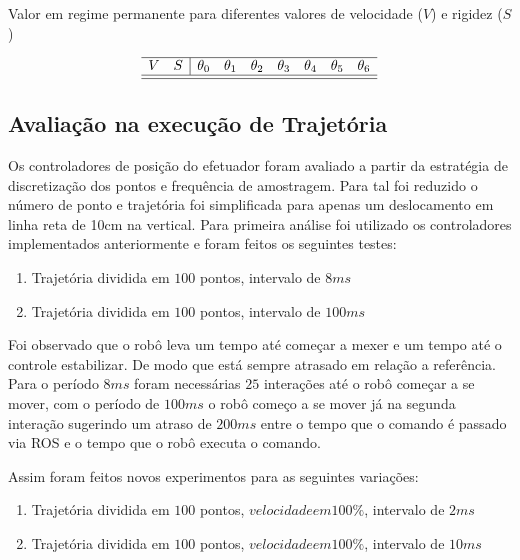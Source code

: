\begin{table}[H]
    \centering
    \caption{Valor em regime permanente para diferentes valores de velocidade ($V$) e rigidez ($S$)}
    $$\begin{array}{cc|ccccccc}
         \hline
         V & S & \theta_0 & \theta_1 & \theta_2 & \theta_3 & \theta_4 & \theta_5 & \theta_6\\
         \hline
         
         \hline
    \end{array}$$
    \label{tab:jointIdentification_steadstatetable}
\end{table}


\subsection{Avaliação na execução de Trajetória}


Os controladores de posição do efetuador foram avaliado a partir da estratégia de discretização dos pontos e frequência de amostragem. Para tal foi reduzido o número de ponto e trajetória foi simplificada para apenas um deslocamento em linha reta de 10cm na vertical. Para primeira análise foi utilizado os controladores implementados anteriormente e foram feitos os seguintes testes:

\begin{enumerate}
    \item Trajetória dividida em $100$ pontos, intervalo de $8 ms$
    \item Trajetória dividida em $100$ pontos, intervalo de $100 ms$
\end{enumerate}

Foi observado que o robô leva um tempo até começar a mexer e um tempo até o controle estabilizar. De modo que está sempre atrasado em relação a referência. Para o período $8 ms$ foram necessárias $25$ interações até o robô começar a se mover, com o período de $100 ms$ o robô começo a se mover já na segunda interação sugerindo um atraso de $200 ms$ entre o tempo que o comando é passado via ROS e o tempo que o robô executa o comando.


Assim foram feitos novos experimentos para as seguintes variações:

\begin{enumerate}
    \item Trajetória dividida em $100$ pontos, $velocidade em 100\%$, intervalo de $2 ms$
    \item Trajetória dividida em $100$ pontos, $velocidade em 100\%$, intervalo de $10 ms$
\end{enumerate}

